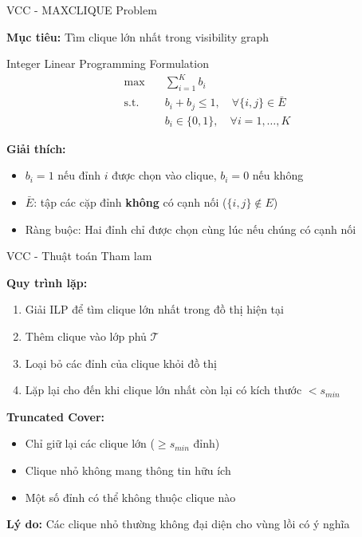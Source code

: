\documentclass[aspectratio=169]{beamer}
\begin{document}
\begin{frame}{VCC - MAXCLIQUE Problem}

    \textbf{Mục tiêu:} Tìm clique lớn nhất trong visibility graph

    \vspace{0.5em}
    \begin{block}{Integer Linear Programming Formulation}
        \small
        \[
            \begin{aligned}
                \max \quad        & \sum_{i=1}^{K} b_i                                  \\
                \text{s.t.} \quad & b_i + b_j \leq 1, \quad \forall \{i,j\} \in \bar{E} \\
                                  & b_i \in \{0, 1\}, \quad \forall i = 1, \ldots, K
            \end{aligned}
        \]
    \end{block}

    \vspace{0.5em}
    \textbf{Giải thích:}
    \begin{itemize}
        \item $b_i = 1$ nếu đỉnh $i$ được chọn vào clique, $b_i = 0$ nếu không
        \item $\bar{E}$: tập các cặp đỉnh \textbf{không} có cạnh nối ($\{i,j\} \notin E$)
        \item Ràng buộc: Hai đỉnh chỉ được chọn cùng lúc nếu chúng có cạnh nối
    \end{itemize}

\end{frame}

\begin{frame}{VCC - Thuật toán Tham lam}

    \textbf{Quy trình lặp:}
    \begin{enumerate}
        \item Giải ILP để tìm clique lớn nhất trong đồ thị hiện tại
        \item Thêm clique vào lớp phủ $\mathcal{T}$
        \item Loại bỏ các đỉnh của clique khỏi đồ thị
        \item Lặp lại cho đến khi clique lớn nhất còn lại có kích thước $< s_{min}$
    \end{enumerate}

    \vspace{0.5em}
    \textbf{Truncated Cover:}
    \begin{itemize}
        \item Chỉ giữ lại các clique lớn ($\geq s_{min}$ đỉnh)
        \item Clique nhỏ không mang thông tin hữu ích
        \item Một số đỉnh có thể không thuộc clique nào
    \end{itemize}

    \vspace{0.5em}
    \textbf{Lý do:} Các clique nhỏ thường không đại diện cho vùng lồi có ý nghĩa

\end{frame}
\end{document}
